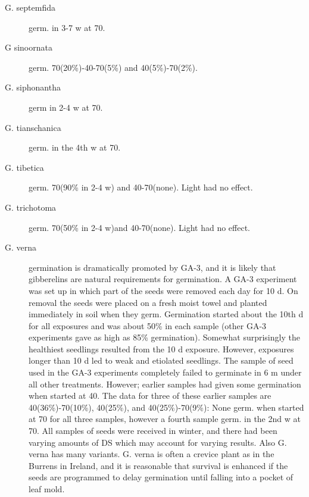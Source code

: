 \begin{description}
\item[G. septemfida] germ. in 3-7 w at 70.
\item[G sinoornata] germ. 70(20\%)-40-70(5\%) and 40(5\%)-70(2\%).
\item[G. siphonantha] germ in 2-4 w at 70.
\item[G. tianschanica] germ. in the 4th w at 70.
\item[G. tibetica] germ. 70(90\% in 2-4 w) and 40-70(none). Light had no effect.
\item[G. trichotoma] germ. 70(50\% in 2-4 w)and 40-70(none). Light had no effect.
\item[G. verna] germination is dramatically promoted by GA-3, and it is likely that
gibberelins are natural requirements for germination. A GA-3 experiment was set up
in which part of the seeds were removed each day for 10 d. On removal the seeds
were placed on a fresh moist towel and planted immediately in soil when they germ.
Germination started about the 10th d for all exposures and was about 50\% in each
sample (other GA-3 experiments gave as high as 85\% germination). Somewhat
surprisingly the healthiest seedlings resulted from the 10 d exposure. However,
exposures longer than 10 d led to weak and etiolated seedlings. The sample of seed
used in the GA-3 experiments completely failed to germinate in 6 m under all other
treatments. However; earlier samples had given some germination when started at
40. The data for three of these earlier samples are 40(36\%)-70(10\%), 40(25\%), and
40(25\%)-70(9\%): None germ. when started at 70 for all three samples, however a
fourth sample germ. in the 2nd w at 70. All samples of seeds were received in winter,
and there had been varying amounts of DS which may account for varying results.
Also G. verna has many variants. G. verna is often a crevice plant as in the Burrens in
Ireland, and it is reasonable that survival is enhanced if the seeds are programmed to
delay germination until falling into a pocket of leaf mold.


\end{description}
